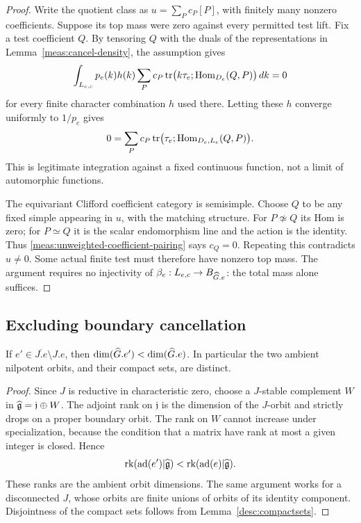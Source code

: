 \begin{proof}
Write the quotient class as $u=\sum_P c_P[P]$, with finitely many nonzero
coefficients.  Suppose its top mass were zero against every permitted test
lift.  Fix a test coefficient $Q$.  By tensoring $Q$ with the duals of the
representations in Lemma~\ref{meas:cancel-density}, the assumption gives
\[
 \int_{L_{e,c}}p_e(k)h(k)
    \sum_P c_P\operatorname{tr}
          \bigl(k\tau_e;\operatorname{Hom}_{D_e}(Q,P)\bigr)\,dk=0
\]
for every finite character combination $h$ used there.  Letting these
$h$ converge uniformly to $1/p_e$ gives
\begin{equation}\label{meas:unweighted-coefficient-pairing}
 0=\sum_P c_P\operatorname{tr}
            \bigl(\tau_e;\operatorname{Hom}_{D_e,L_e}(Q,P)\bigr).
\end{equation}
This is legitimate integration against a fixed continuous function, not
a limit of automorphic functions.

The equivariant Clifford coefficient category is semisimple.  Choose
$Q$ to be any fixed simple appearing in $u$, with the matching structure.
For $P\not\simeq Q$ its Hom is zero; for $P\simeq Q$ it is the scalar
endomorphism line and the action is the identity.  Thus
\eqref{meas:unweighted-coefficient-pairing} says $c_Q=0$.  Repeating this
contradicts $u\ne0$.  Some actual finite test must therefore have nonzero
top mass.  The argument requires no injectivity of
$\beta_e:L_{e,c}\to B_{\widehat G.e}$: the total mass alone suffices.
\end{proof}

\subsection{Excluding boundary cancellation}

\begin{lemma}\label{meas:boundary-rank}
If $e'\in\overline{J.e}\setminus J.e$, then
$\dim(\widehat G.e')<\dim(\widehat G.e)$.  In particular the two ambient nilpotent
orbits, and their compact sets, are distinct.
\end{lemma}

\begin{proof}
Since $J$ is reductive in characteristic zero, choose a $J$-stable
complement $W$ in $\widehat{\mathfrak g}=\mathfrak j\oplus W$.  The adjoint rank on
$\mathfrak j$ is the dimension of the $J$-orbit and strictly drops on a
proper boundary orbit.  The rank on $W$ cannot increase under
specialization, because the condition that a matrix have rank at most a
given integer is closed.  Hence
\[
 \operatorname{rk}(\operatorname{ad}(e')|\widehat{\mathfrak g})
 <\operatorname{rk}(\operatorname{ad}(e)|\widehat{\mathfrak g}).
\]
These ranks are the ambient orbit dimensions.  The same argument works
for a disconnected $J$, whose orbits are finite unions of orbits of its
identity component.  Disjointness of the compact sets follows from
Lemma~\ref{desc:compactsets}.
\end{proof}

